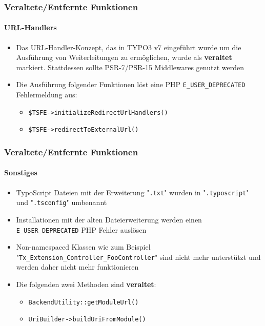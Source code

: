 \begin{frame}[fragile]
	\frametitle{Veraltete/Entfernte Funktionen}
	\framesubtitle{URL-Handlers}

	\begin{itemize}
		\item Das  URL-Handler-Konzept, das in TYPO3 v7 eingeführt wurde um die 
			Ausführung von Weiterleitungen zu ermöglichen, wurde als \textbf{veraltet} markiert. 
			Stattdessen sollte PSR-7/PSR-15 Middlewares genutzt werden

		\item Die Ausführung folgender Funktionen löst eine PHP
			\texttt{E\_USER\_DEPRECATED} Fehlermeldung aus:

			\begin{itemize}
				\item \texttt{\$TSFE->initializeRedirectUrlHandlers()}
				\item \texttt{\$TSFE->redirectToExternalUrl()}
			\end{itemize}

	\end{itemize}

\end{frame}


\begin{frame}[fragile]
	\frametitle{Veraltete/Entfernte Funktionen}
	\framesubtitle{Sonstiges}

	\begin{itemize}
		\item TypoScript Dateien mit der Erweiterung "\texttt{.txt}" wurden in
			"\texttt{.typoscript}" und "\texttt{.tsconfig}" umbenannt
		\item Installationen mit der alten Dateierweiterung werden 
			einen \texttt{E\_USER\_DEPRECATED} PHP Fehler auslösen 
		\item Non-namespaced Klassen wie zum Beispiel
			"\texttt{Tx\_Extension\_Controller\_FooController}"\newline
			sind nicht mehr unterstützt und werden daher nicht mehr funktionieren 
		\item Die folgenden zwei Methoden sind \textbf{veraltet}:

			\begin{itemize}
				\item \texttt{BackendUtility::getModuleUrl()}
				\item \texttt{UriBuilder->buildUriFromModule()}
			\end{itemize}

	\end{itemize}

\end{frame}

